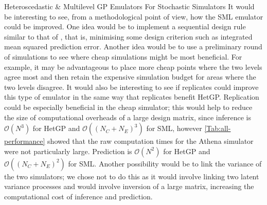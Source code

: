 \begin{chapter}{Heteroscedastic \& Multilevel GP Emulators For Stochastic Simulators\label{Ch:Hetsml}}
It would be interesting to see, from a methodological point of view, how the SML emulator could be improved. One idea would be to implement a sequential design rule similar to that of \citet{Gratiet2015}, that is, minimising some design criterion such as integrated mean squared prediction error. Another idea would be to use a preliminary round of simulations to see where cheap simulations might be most beneficial. For example, it may be advantageous to place more cheap points where the two levels agree most and then retain the expensive simulation budget for areas where the two levels disagree. It would also be interesting to see if replicates could improve this type of emulator in the same way that replicates benefit HetGP. Replication could be especially beneficial in the cheap simulator; this would help to reduce the size of computational overheads of a large design matrix, since inference is $\mathcal{O}(N^3)$ for HetGP and $\mathcal{O}\left((N_C+N_E)^3\right)$ for SML, however \cref{Tab:all-performance} showed that the raw computation times for the Athena simulator were not particularly large. Prediction is $\mathcal{O}\left(N^2\right)$ for HetGP and $\mathcal{O}\left((N_C+N_E)^2\right)$ for SML. Another possibility would be to link the variance of the two simulators; we chose not to do this as it would involve linking two latent variance processes and would involve inversion of a large matrix, increasing the computational cost of inference and prediction.


\end{chapter}
